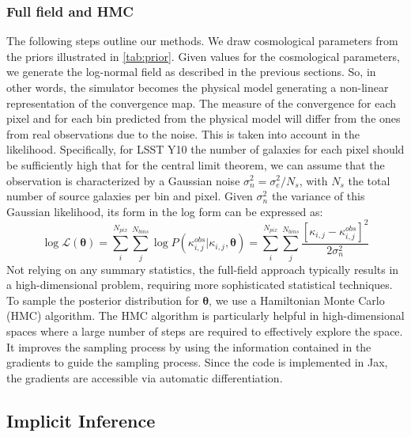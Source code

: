 \documentclass{aa}
\begin{document}
\subsubsection{Full field and HMC}
The following steps outline our methods. We draw cosmological parameters from the priors illustrated in \autoref{tab:prior}. Given values for the cosmological parameters, we generate the log-normal field as described in the previous sections. So, in other words, the simulator becomes the physical model generating a non-linear representation of the convergence map. The measure of the convergence for each pixel and for each bin predicted from the physical model will differ from the ones from real observations due to the noise.  This is taken into account in the likelihood. Specifically, for LSST Y10 the number of galaxies for each pixel should be sufficiently high that for the central limit theorem, we can assume that the observation is characterized by a Gaussian noise $\sigma_n^2=\sigma_e^2/N_s$, with $N_s$ the total number of source galaxies per bin and pixel. Given $\sigma_n^2$ the variance of this Gaussian likelihood, its form in the log form can be expressed as:
\begin{equation}
    \log{\mathcal{L}}(\bm{\theta})=
    \sum_i^{N_{pix}} \sum_{j}^{N_{bins}} \log{P(\kappa^{obs}_{i,j}|\kappa_{i,j},\bm{\theta})}
    =\sum_i^{N_{pix}} \sum_{j}^{N_{bins}}\frac{[\kappa_{i,j}-\kappa^{obs}_{i,j}]^2}{2\sigma_n^2}
\end{equation}
Not relying on any summary statistics, the full-field approach typically results in a high-dimensional problem, requiring more sophisticated statistical techniques. To sample the posterior distribution for $\bm{\theta}$, we use a Hamiltonian Monte Carlo (HMC) algorithm. The HMC algorithm is particularly helpful in high-dimensional spaces where a large number of steps are required to effectively explore the space. It improves the sampling process by using the information contained in the gradients to guide the sampling process. Since the code is implemented in Jax, the gradients are accessible via automatic differentiation. 

\subsection{Implicit Inference}
\end{document}
